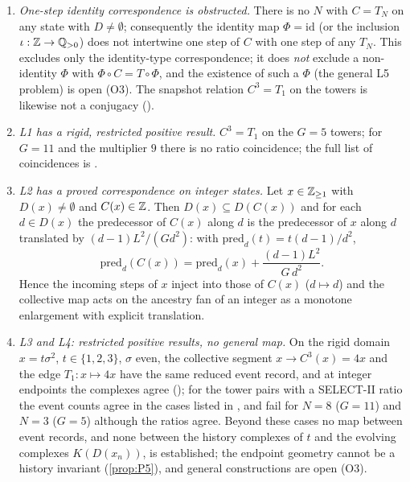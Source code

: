 \begin{proposition}\label{prop:P9}
\begin{enumerate}[label=(\alph*),itemsep=1pt]
\item \emph{One-step identity correspondence is obstructed.} There is no $N$ with $C=T_N$ on any state with $D\ne\emptyset$; consequently the identity map $\Phi=\mathrm{id}$ (or the inclusion $\iota:\mathbb Z\to\mathbb Q_{>0}$) does not intertwine one step of $C$ with one step of any $T_N$. This excludes only the identity-type correspondence; it does \emph{not} exclude a non-identity $\Phi$ with $\Phi\circ C=T\circ\Phi$, and the existence of such a $\Phi$ (the general L5 problem) is open (O3). The snapshot relation $C^3=T_1$ on the towers is likewise not a conjugacy ().
\item \emph{L1 has a rigid, restricted positive result.} $C^3=T_1$ on the $G=5$ towers; for $G=11$ and the multiplier $9$ there is no ratio coincidence; the full list of coincidences is .
\item \emph{L2 has a proved correspondence on integer states.} Let $x\in\mathbb Z_{\ge1}$ with $D(x)\ne\emptyset$ and $C(x)\in\mathbb Z$. Then $D(x)\subseteq D(C(x))$ and for each $d\in D(x)$ the predecessor of $C(x)$ along $d$ is the predecessor of $x$ along $d$ translated by $(d-1)L^2/(Gd^2)$: with $\mathrm{pred}_d(t)=t(d-1)/d^2$,
\[\mathrm{pred}_d(C(x))=\mathrm{pred}_d(x)+\frac{(d-1)L^2}{G\,d^2}.\]
Hence the incoming steps of $x$ inject into those of $C(x)$ ($d\mapsto d$) and the collective map acts on the ancestry fan of an integer as a monotone enlargement with explicit translation.
\item \emph{L3 and L4: restricted positive results, no general map.} On the rigid domain $x=t\sigma^2$, $t\in\{1,2,3\}$, $\sigma$ even, the collective segment $x\to C^3(x)=4x$ and the edge $T_1:x\mapsto4x$ have the same reduced event record, and at integer endpoints the complexes agree (); for the tower pairs with a SELECT-II ratio the event counts agree in the cases listed in , and fail for $N=8$ ($G=11$) and $N=3$ ($G=5$) although the ratios agree. Beyond these cases no map between event records, and none between the history complexes of $t$ and the evolving complexes $K(D(x_n))$, is established; the endpoint geometry cannot be a history invariant (\cref{prop:P5}), and general constructions are open (O3).
\end{enumerate}
\end{proposition}
